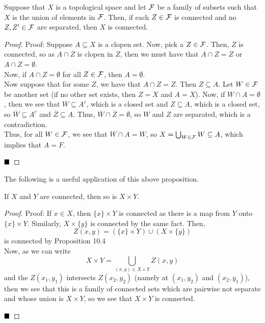 \begin{lemma}
    Suppose that $X$ is a topological space and let $\cal{F}$ be a family of subsets such that $X$ is the union of elements in $\cal{F}$. Then, if each $Z \in \cal{F}$ is connected and no $Z, Z' \in \cal{F}$ are separated, then $X$ is connected. 
\end{lemma}
\begin{proof}{Proof:}
    Suppose $A \subseteq X$ is a clopen set. Now, pick a $Z \in \cal{F}$. Then, $Z$ is connected, so as $A \cap Z$ is clopen in $Z$, then we must have that $A \cap Z = Z$ or $A \cap Z = \emptyset$.\\

    Now, if $A \cap Z = \emptyset$ for all $Z \in \cal{F}$, then $A = \emptyset$.\\

    Now suppose that for some $Z$, we have that $A \cap Z = Z$. Then $Z \subseteq A$. Let $W \in \cal{F}$ be another set (if no other set exists, then $Z = X$ and $A = X$). Now, if $W \cap A = \emptyset$, then we see that $W \subseteq A^{c}$, which is a closed set and $Z \subseteq A$, which is a closed set, so $\overline{W} \subseteq A^{c}$ and $\overline{Z} \subseteq A$. Thus, $\overline{W} \cap \overline{Z} = \emptyset$, so $W$ and $Z$ are separated, which is a contradiction.\\

    Thus, for all $W \in \cal{F}$, we see that $W \cap A = W$, so $X = \bigcup_{W \in \cal{F}} W \subseteq A$, which implies that $A = F$. 
    
    $\qed$
\end{proof}
The following is a useful application of this above proposition.

\begin{lemma}
    If $X$ and $Y$ are connected, then so is $X \times Y$. 
\end{lemma}
\begin{proof}{Proof:}
    If $x \in X$, then $\{x\} \times Y$ is connected as there is a map from $Y$ onto $\{x\} \times Y$. Similarly, $X \times \{y\}$ is connected by the same fact. Then, 
    \[ Z(x, y) = (\{x\} \times Y) \cup (X \times \{y\}) \]
    is connected by Proposition 10.4\\

    Now, as we can write
    \[ X \times Y = \bigcup_{(x, y) \in X \times Y} Z(x, y) \]
    and the $Z(x_1, y_1)$ intersects $Z(x_2, y_2)$ (namely at $(x_1, y_2)$ and $(x_2, y_1)$), then we see that this is a family of connected sets which are pairwise not separate and whose union is $X \times Y$, so we see that $X \times Y$ is connected.

    $\qed$
\end{proof}


